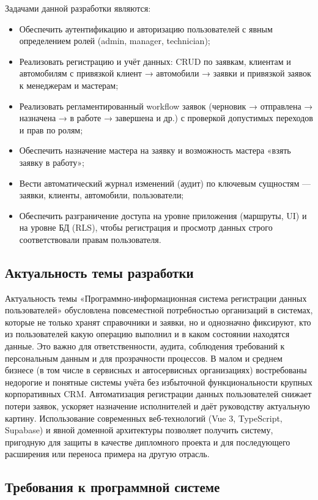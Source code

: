 Задачами данной разработки являются:
\begin{itemize}
\item Обеспечить аутентификацию и авторизацию пользователей с явным определением ролей (admin, manager, technician);
\item Реализовать регистрацию и учёт данных: CRUD по заявкам, клиентам и автомобилям с привязкой клиент → автомобили → заявки и привязкой заявок к менеджерам и мастерам;
\item Реализовать регламентированный workflow заявок (черновик → отправлена → назначена → в работе → завершена и др.) с проверкой допустимых переходов и прав по ролям;
\item Обеспечить назначение мастера на заявку и возможность мастера «взять заявку в работу»;
\item Вести автоматический журнал изменений (аудит) по ключевым сущностям — заявки, клиенты, автомобили, пользователи;
\item Обеспечить разграничение доступа на уровне приложения (маршруты, UI) и на уровне БД (RLS), чтобы регистрация и просмотр данных строго соответствовали правам пользователя.
\end{itemize}

\subsection{Актуальность темы разработки}

Актуальность темы «Программно-информационная система регистрации данных пользователей» обусловлена повсеместной потребностью организаций в системах, которые не только хранят справочники и заявки, но и однозначно фиксируют, кто из пользователей какую операцию выполнил и в каком состоянии находятся данные. Это важно для ответственности, аудита, соблюдения требований к персональным данным и для прозрачности процессов. В малом и среднем бизнесе (в том числе в сервисных и автосервисных организациях) востребованы недорогие и понятные системы учёта без избыточной функциональности крупных корпоративных CRM. Автоматизация регистрации данных пользователей снижает потери заявок, ускоряет назначение исполнителей и даёт руководству актуальную картину. Использование современных веб-технологий (Vue 3, TypeScript, Supabase) и явной доменной архитектуры позволяет получить систему, пригодную для защиты в качестве дипломного проекта и для последующего расширения или переноса примера на другую отрасль.

\subsection{Требования к программной системе}
